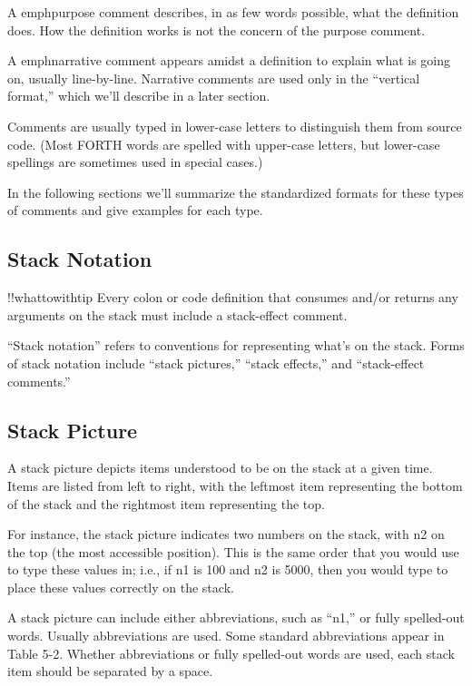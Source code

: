 A emph{purpose comment} describes, in as few words possible, what the
definition does.  How the definition works is not the concern of the purpose
comment.

A emph{narrative comment} appears amidst a definition to explain what is
going on, usually line-by-line.  Narrative comments are used only in the
``vertical format,'' which we'll describe in a later section.

Comments are usually typed in lower-case letters to distinguish
them from source code.  (Most FORTH words are spelled with upper-case
letters, but lower-case spellings are sometimes used in special cases.)

In the following sections we'll summarize the standardized formats
for these types of comments and give examples for each type.

\subsection{Stack Notation}
!!whattowithtip{
Every colon or code definition that consumes and/or returns any arguments
on the stack must include a stack-effect comment.
}


``Stack notation'' refers to conventions for representing what's on the
stack.  Forms of stack notation include ``stack pictures,'' ``stack effects,''
and ``stack-effect comments.''

\subsection{Stack Picture}

A stack picture depicts items understood to be on the stack at a given
time.  Items are listed from left to right, with the leftmost item representing
the bottom of the stack and the rightmost item representing the top.

For instance, the stack picture
indicates two numbers on the stack, with n2 on the top (the most accessible
position).
This is the same order that you would use to type these values in;
i.e., if n1 is 100 and n2 is 5000, then you would type
to place these values correctly on the stack.

A stack picture can include either abbreviations, such as ``n1,'' or
fully spelled-out words.  Usually abbreviations are used.  Some standard
abbreviations appear in Table 5-2.  Whether abbreviations or fully
spelled-out words are used, each stack item should be separated by a
space.

